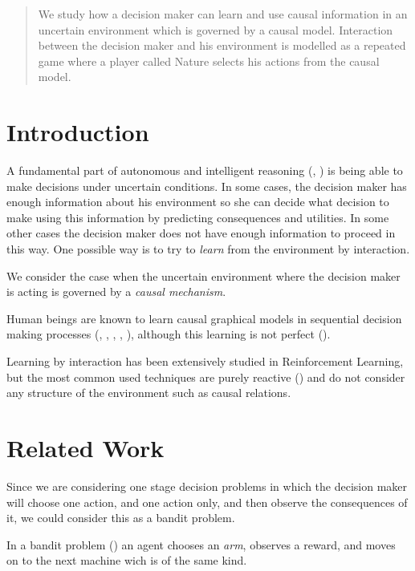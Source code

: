 \documentclass{article}
\begin{document}
\begin{abstract}
We study how a decision maker can learn and use causal information in an uncertain environment which is governed by a causal model. 
Interaction between the decision maker and his environment is modelled as a repeated game where a player called Nature selects his actions from the causal model.
\end{abstract}

\section{Introduction}
A fundamental part of autonomous and intelligent reasoning (\cite{lake2017building}, \cite{danks2014unifying}) is being able to make decisions under uncertain conditions. In some cases, the decision maker has enough information about his environment so she can decide what decision to make using this information by predicting consequences and utilities. In some other cases the decision maker does not have enough information to proceed in this way. One possible way is to try to \textit{learn} from the environment by interaction.

We consider the case when the uncertain environment where the decision maker is acting is governed by a \textit{causal mechanism}. 

Human beings are known to learn causal graphical models in sequential decision making processes (\cite{sloman2006causal}, \cite{nichols2007decision}, \cite{meder2010observing}, \cite{hagmayer2013repeated}, \cite{danks2014unifying}), although this learning is not perfect (\cite{rottman2014reasoning}).

Learning by interaction has been extensively studied in Reinforcement Learning, but the most common used techniques are purely reactive (\cite{garnelo2016towards}) and do not consider any structure of the environment such as causal relations.

\section{Related Work}
Since we are considering one stage decision problems in which the decision maker will choose one action, and one action only, and then observe the consequences of it, we could consider this as a bandit problem.

In a bandit problem (\cite{sutton1998reinforcement}) an agent chooses an \textit{arm}, observes a reward, and moves on to the next machine wich is of the same kind.
\end{document}
